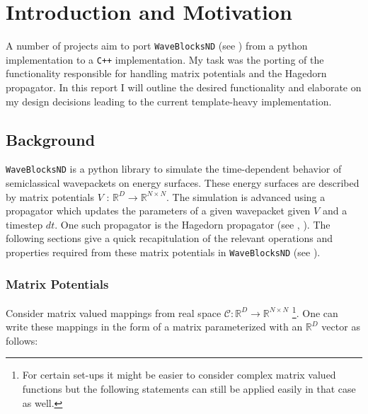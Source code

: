 
\chapter{Introduction and Motivation} %

\label{Introduction} %


A number of projects aim to port \texttt{WaveBlocksND} (see \cite{waveblocksnd}) from a python implementation to a \texttt{C++} implementation. My task was the porting of the functionality responsible for handling matrix potentials and the Hagedorn propagator. In this report I will outline the desired functionality and elaborate on my design decisions leading to the current template-heavy implementation.

\section{Background}
\texttt{WaveBlocksND} is a python library to simulate the time-dependent behavior of semiclassical wavepackets on energy surfaces. These energy surfaces are described by matrix potentials $V$ : $\mathbb{R}^D \rightarrow \mathbb{R}^{N\times N}$. The simulation is advanced using a propagator which updates the parameters of a given wavepacket given $V$ and a timestep $dt$. One such propagator is the Hagedorn propagator (see \cite{FGL_semiclassical_dynamics}, \cite{H_ladder_operators}).
The following sections give a quick recapitulation of the relevant operations and properties required from these matrix potentials in \texttt{WaveBlocksND} (see \cite{B_master_thesis}).

\subsection{Matrix Potentials}
Consider matrix valued mappings from real space $\mathcal{C} : \mathbb{R}^D \rightarrow \mathbb{R}^{N\times N}$ \footnote{For certain set-ups it might be easier to consider complex matrix valued functions but the following statements can still be applied easily in that case as well.}. One can write these mappings in the form of a matrix parameterized with an $\mathbb{R}^D$ vector as follows:

